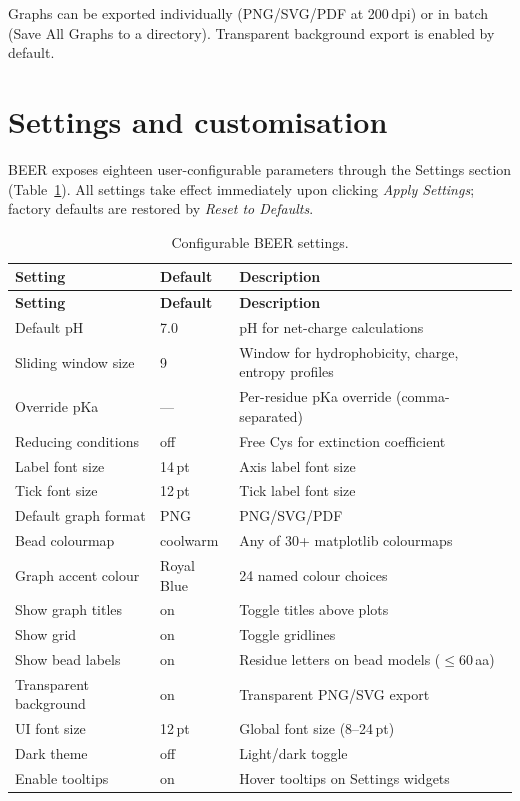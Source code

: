 \documentclass[12pt]{article}
\begin{document}
Graphs can be exported individually (PNG/SVG/PDF at 200\,dpi) or in batch
(Save All Graphs to a directory).
Transparent background export is enabled by default.

\section{Settings and customisation}

BEER exposes eighteen user-configurable parameters through the Settings section
(Table~\ref{tab:settings}).
All settings take effect immediately upon clicking \emph{Apply Settings};
factory defaults are restored by \emph{Reset to Defaults}.

\begin{longtable}{p{4cm}p{2.5cm}p{7.5cm}}
\caption{Configurable BEER settings.}
\label{tab:settings}\\
\toprule
\textbf{Setting} & \textbf{Default} & \textbf{Description} \\
\midrule
\endfirsthead
\toprule
\textbf{Setting} & \textbf{Default} & \textbf{Description} \\
\midrule
\endhead
\bottomrule
\endlastfoot
Default pH                  & 7.0    & pH for net-charge calculations \\
Sliding window size         & 9      & Window for hydrophobicity, charge, entropy profiles \\
Override pKa                & ---    & Per-residue pKa override (comma-separated) \\
Reducing conditions         & off    & Free Cys for extinction coefficient \\
Label font size             & 14\,pt & Axis label font size \\
Tick font size              & 12\,pt & Tick label font size \\
Default graph format        & PNG    & PNG/SVG/PDF \\
Bead colourmap              & coolwarm & Any of 30+ matplotlib colourmaps \\
Graph accent colour         & Royal Blue & 24 named colour choices \\
Show graph titles           & on     & Toggle titles above plots \\
Show grid                   & on     & Toggle gridlines \\
Show bead labels            & on     & Residue letters on bead models ($\leq$60\,aa) \\
Transparent background      & on     & Transparent PNG/SVG export \\
UI font size                & 12\,pt & Global font size (8--24\,pt) \\
Dark theme                  & off    & Light/dark toggle \\
Enable tooltips             & on     & Hover tooltips on Settings widgets \\
\end{longtable}
\end{document}
